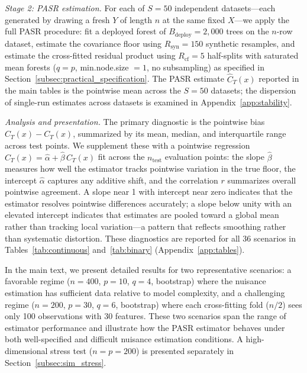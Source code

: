 \documentclass[11pt]{article}
\theoremstyle{plain}
\theoremstyle{definition}
\theoremstyle{remark}
\begin{document}
\medskip
\noindent\textit{Stage 2: PASR estimation.}\quad
For each of $S = 50$ independent datasets---each generated by drawing a fresh $Y$ of length $n$ at the same fixed $X$---we apply the full PASR procedure: fit a deployed forest of $B_{\mathrm{deploy}} = 2{,}000$ trees on the $n$-row dataset, estimate the covariance floor using $R_{\mathrm{syn}} = 150$ synthetic resamples, and estimate the cross-fitted residual product using $R_{\mathrm{cf}} = 5$ half-splits with saturated mean forests ($q = p$, min.node.size $= 1$, no subsampling) as specified in Section~\ref{subsec:practical_specification}. The PASR estimate $\widehat C_T(x)$ reported in the main tables is the pointwise mean across the $S = 50$ datasets; the dispersion of single-run estimates across datasets is examined in Appendix~\ref{app:stability}.

\medskip
\noindent\textit{Analysis and presentation.}\quad
The primary diagnostic is the pointwise bias $\widehat C_T(x) - C_T(x)$, summarized by its mean, median, and interquartile range across test points. We supplement these with a pointwise regression $\widehat C_T(x) = \hat\alpha + \hat\beta\, C_T(x)$ fit across the $n_{\mathrm{test}}$ evaluation points: the slope $\hat\beta$ measures how well the estimator tracks pointwise variation in the true floor, the intercept $\hat\alpha$ captures any additive shift, and the correlation $r$ summarizes overall pointwise agreement. A slope near 1 with intercept near zero indicates that the estimator resolves pointwise differences accurately; a slope below unity with an elevated intercept indicates that estimates are pooled toward a global mean rather than tracking local variation---a pattern that reflects smoothing rather than systematic distortion. These diagnostics are reported for all 36 scenarios in Tables~\ref{tab:continuous} and~\ref{tab:binary} (Appendix~\ref{app:tables}).

In the main text, we present detailed results for two representative scenarios: a favorable regime ($n = 400$, $p = 10$, $q = 4$, bootstrap) where the nuisance estimation has sufficient data relative to model complexity, and a challenging regime ($n = 200$, $p = 30$, $q = 6$, bootstrap) where each cross-fitting fold ($n/2$) sees only 100 observations with 30 features. These two scenarios span the range of estimator performance and illustrate how the PASR estimator behaves under both well-specified and difficult nuisance estimation conditions. A high-dimensional stress test ($n = p = 200$) is presented separately in Section~\ref{subsec:sim_stress}.
\end{document}
